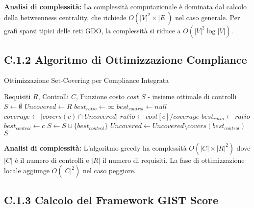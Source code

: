 \textbf{Analisi di complessità:} La complessità computazionale è dominata dal calcolo della betweenness centrality, che richiede $O(|V|^2 \times |E|)$ nel caso generale. Per grafi sparsi tipici delle reti GDO, la complessità si riduce a $O(|V|^2 \log |V|)$.

\subsection{C.1.2 Algoritmo di Ottimizzazione Compliance}

\begin{algorithm}
\caption{Ottimizzazione Set-Covering per Compliance Integrata}
\label{alg:compliance}
\begin{algorithmic}[1]
\Require Requisiti $R$, Controlli $C$, Funzione costo $cost$
\Ensure $S$ - insieme ottimale di controlli
\State $S \gets \emptyset$
\State $Uncovered \gets R$
    \State $best_{ratio} \gets \infty$
    \State $best_{control} \gets null$
        \State $coverage \gets |covers(c) \cap Uncovered|$
            \State $ratio \gets cost[c] / coverage$
                \State $best_{ratio} \gets ratio$
                \State $best_{control} \gets c$
            \EndIf
        \EndIf
    \EndFor
    \State $S \gets S \cup \{best_{control}\}$
    \State $Uncovered \gets Uncovered \setminus covers(best_{control})$
\EndWhile
\State \Return $S$
\end{algorithmic}
\end{algorithm}

\textbf{Analisi di complessità:} L'algoritmo greedy ha complessità $O(|C| \times |R|^2)$ dove $|C|$ è il numero di controlli e $|R|$ il numero di requisiti. La fase di ottimizzazione locale aggiunge $O(|C|^2)$ nel caso peggiore.

\subsection{C.1.3 Calcolo del Framework GIST Score}

